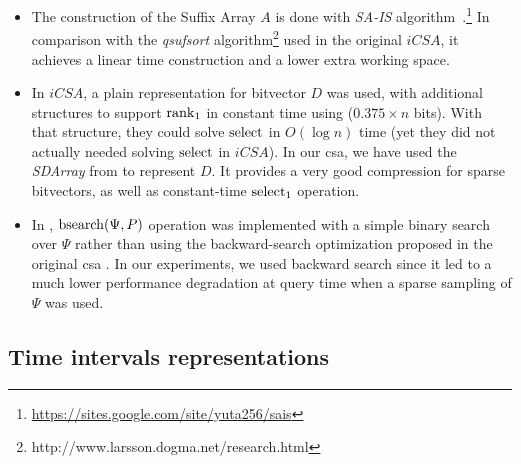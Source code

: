 	\begin{itemize}
		\item The construction of the Suffix Array $A$ is done with 
		{\em SA-IS} algorithm~\cite{nong2011two}.\footnote{\url{ https://sites.google.com/site/yuta256/sais}} 
		In comparison with the  {\em qsufsort} algorithm\footnote{
			http://www.larsson.dogma.net/research.html}
		\cite{Larsson:2007:FSS:1314704.1314853} used in the original $iCSA$, it achieves a linear time construction 
		and a lower extra working space. 
		
		\item In  $iCSA$, a plain representation for bitvector $D$ was used, with additional structures to support
		$\operatorname{rank}_1$ in constant time using ($0.375\times n$ bits). With that structure, they could solve $\operatorname{select}$ in $O(\log n)$ time (yet 
		they did not actually needed solving $\operatorname{select}$ in $iCSA$).
		In our \gls{csa}, we have used the {\em SDArray} from \cite{okanohara2007practical} to represent $D$. It provides a very 
		good compression for sparse bitvectors, as well as constant-time $\operatorname{select}_1$ operation.
		
		\item In \cite{FBNCPR12}, $\operatorname{bsearch}(\Psi,P)$ operation was implemented with a simple binary search over $\Psi$ rather than
		using the backward-search optimization proposed in the original \gls{csa} \cite{Sad03}. In our experiments, we used
		backward search since it led to a much lower performance degradation at query time when a sparse sampling of $\Psi$ 
		was used.
		
	\end{itemize}

	\subsection{Time intervals representations}
	\label{sec:ctr:str:temp}

